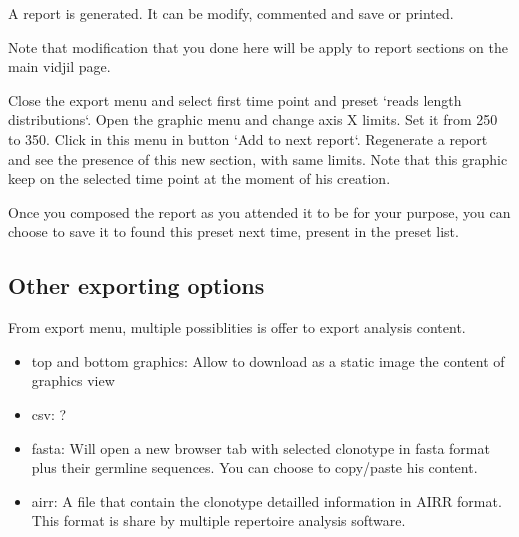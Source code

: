 

A report is generated. It can be modify, commented and save or printed.


Note that modification that you done here will be apply to report sections on the main vidjil page.


Close the export menu and select first time point and preset `reads length distributions`.
Open the graphic menu and change axis X limits. Set it from 250 to 350.
Click in this menu in button `Add to next report`. 
Regenerate a report and see the presence of this new section, with same limits.
Note that this graphic keep on the selected time point at the moment of his creation.

Once you composed the report as you attended it to be for your purpose, you can choose to save it to found this preset next time, present in the preset list.

\subsection{Other exporting options}

From export menu, multiple possiblities is offer to export analysis content.
\begin{itemize}
  \item top and bottom graphics: Allow to download as a static image the content of graphics view
  \item csv:  ? %
  \item fasta: Will open a new browser tab with selected clonotype in fasta format plus their germline sequences. You can choose to copy/paste his content.
  \item airr: A file that contain the clonotype detailled information in AIRR format. This format is share by multiple repertoire analysis software. 
\end{itemize}

